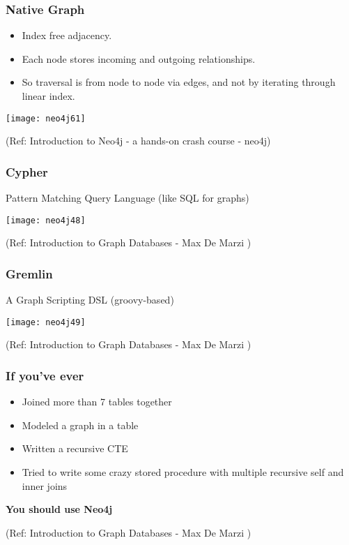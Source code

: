 \begin{frame}\frametitle{Native Graph}

\begin{itemize}
\item Index free adjacency.
\item Each node stores incoming and outgoing relationships.
\item So traversal is from node to node via edges, and not by iterating through linear index.
\end{itemize}

\begin{center}
\texttt{[image: neo4j61]}
\end{center}	

{\tiny (Ref: Introduction to Neo4j - a hands-on crash course - neo4j)}
\end{frame}


\begin{frame}\frametitle{Cypher}

Pattern Matching Query Language (like SQL for graphs)

\begin{center}
\texttt{[image: neo4j48]}
\end{center}	

{\tiny (Ref: Introduction to Graph Databases - Max De Marzi )}
\end{frame}

\begin{frame}\frametitle{Gremlin}

A Graph Scripting DSL (groovy-based)

\begin{center}
\texttt{[image: neo4j49]}
\end{center}	

{\tiny (Ref: Introduction to Graph Databases - Max De Marzi )}
\end{frame}

\begin{frame}\frametitle{If you’ve ever}

\begin{itemize}
\item Joined more than 7 tables together
\item  Modeled a graph in a table
\item  Written a recursive CTE
\item Tried to write some crazy stored procedure with multiple recursive self and inner joins
\end{itemize}

{\bf You should use Neo4j}

{\tiny (Ref: Introduction to Graph Databases - Max De Marzi )}
\end{frame}


